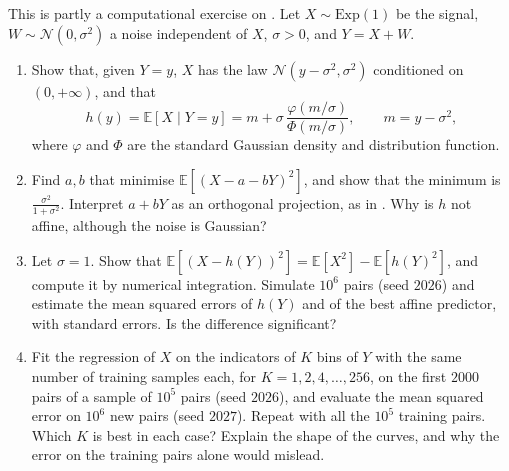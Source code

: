 \begin{exercise}\label{ex:cp-best-predictor}
\medium This is partly a computational exercise on . Let
$X\sim\mathrm{Exp}(1)$ be the signal, $W\sim\mathcal N(0,\sigma^2)$ a noise independent of $X$,
$\sigma>0$, and $Y=X+W$.
\begin{enumerate}[label=(\alph*)]
  \item Show that, given $Y=y$, $X$ has the law $\mathcal N(y-\sigma^2,\sigma^2)$ conditioned on
    $(0,+\infty)$, and that
    \[
      h(y)=\mathbb E[X\mid Y=y]=m+\sigma\,\frac{\varphi(m/\sigma)}{\Phi(m/\sigma)},\qquad m=y-\sigma^2,
    \]
    where $\varphi$ and $\Phi$ are the standard Gaussian density and distribution function.
  \item Find $a,b$ that minimise $\mathbb E[(X-a-bY)^2]$, and show that the minimum is
    $\frac{\sigma^2}{1+\sigma^2}$. Interpret $a+bY$ as an orthogonal projection, as in
    . Why is $h$ not affine, although the noise is Gaussian?
  \item Let $\sigma=1$. Show that $\mathbb E[(X-h(Y))^2]=\mathbb E[X^2]-\mathbb E[h(Y)^2]$, and
    compute it by numerical integration. Simulate $10^6$ pairs (seed $2026$) and estimate the mean
    squared errors of $h(Y)$ and of the best affine predictor, with standard errors. Is the
    difference significant?
  \item Fit the regression of $X$ on the indicators of $K$ bins of $Y$ with the same number of
    training samples each, for $K=1,2,4,\dots,256$, on the first $2000$ pairs of a sample of
    $10^5$ pairs (seed $2026$), and evaluate the mean squared error on $10^6$ new pairs (seed $2027$).
    Repeat with all the $10^5$ training pairs. Which $K$ is best in each case? Explain the shape of the curves, and why the error on the
    training pairs alone would mislead.
\end{enumerate}
\end{exercise}

